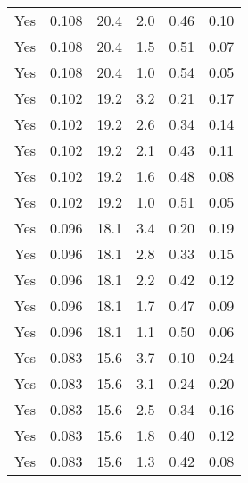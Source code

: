 \begin{longtable}{p{}C{0.10\textwidth}C{0.10\textwidth}C{0.10\textwidth}C{0.10\textwidth}C{0.10\textwidth}}
    Yes & 0.108 & 20.4 & 2.0 & 0.46 & 0.10 \\
    Yes & 0.108 & 20.4 & 1.5 & 0.51 & 0.07 \\
    Yes & 0.108 & 20.4 & 1.0 & 0.54 & 0.05 \\
    Yes & 0.102 & 19.2 & 3.2 & 0.21 & 0.17 \\
    Yes & 0.102 & 19.2 & 2.6 & 0.34 & 0.14 \\
    Yes & 0.102 & 19.2 & 2.1 & 0.43 & 0.11 \\
    Yes & 0.102 & 19.2 & 1.6 & 0.48 & 0.08 \\
    Yes & 0.102 & 19.2 & 1.0 & 0.51 & 0.05 \\
    Yes & 0.096 & 18.1 & 3.4 & 0.20 & 0.19 \\
    Yes & 0.096 & 18.1 & 2.8 & 0.33 & 0.15 \\
    Yes & 0.096 & 18.1 & 2.2 & 0.42 & 0.12 \\
    Yes & 0.096 & 18.1 & 1.7 & 0.47 & 0.09 \\
    Yes & 0.096 & 18.1 & 1.1 & 0.50 & 0.06 \\
    Yes & 0.083 & 15.6 & 3.7 & 0.10 & 0.24 \\
    Yes & 0.083 & 15.6 & 3.1 & 0.24 & 0.20 \\
    Yes & 0.083 & 15.6 & 2.5 & 0.34 & 0.16 \\
    Yes & 0.083 & 15.6 & 1.8 & 0.40 & 0.12 \\
    Yes & 0.083 & 15.6 & 1.3 & 0.42 & 0.08 \\
    \bottomrule
\end{longtable}
